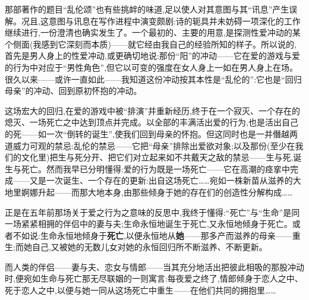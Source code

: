 那部著作的题目“乱伦颂”也有些挑衅的味道,\dmark{}足以使人对其意图与其“讯息”产生误解。况且,这意图与讯息在写作进程中演变颇剧:诗的轭具并未妨碍一项深化的工作继续进行,一份澄清也确实发生了。一个最初的、主要的用意,是探测性爱冲动的某个侧面(我感到它深刻而本质)——就它经由我自己的经验所知的样子。所以说的,首先是男人身上的性爱冲动,或更确切地说:那份“阳”的冲动——它在爱的游戏与爱的行为中对应于“男性角色”,但它以可变的强度在女人身上一如在男人身上在场。很久以来——或许一直如此——我知道这份冲动按其本性是“乱伦的”:它也是“回归母亲”的冲动、回到原初怀抱的冲动。

这场宏大的回归,在爱的游戏中被“排演”并重新经历,终于在一个寂灭、一个存在的熄灭、一场死亡之中达到顶点并完成。以全部的丰满活出爱的行为,也是活出自己的死——如一次“倒转的诞生”,使我们回到母亲的怀抱。但这同时也是一并僭越两道威力可观的禁忌:乱伦的禁忌——它把“母亲”排除出爱欲对象;以及那份(至少在我们的文化里)把生与死分开、把它们对立起来如不共戴天之敌的禁忌——生与死\dmark{},诞生与死亡。然而我早已分明懂得:爱的行为既是一场死亡——它在高潮的痉挛中完成——又是一次诞生、一个存在的更新:出自这场死亡……宛如一株新苗从滋养的大地里婀娜升起——而那大地本身,由那些倾身于她的存在们的创造性分解构成……

正是在五年前那场关于爱之行为之意味的反思中,我终于懂得:“死亡”与“生命”是同一场紧紧相拥的伴侣中的妻与夫;生命永恒地诞生于死亡,又永恒地倾身于死亡。或者不如说:生命永恒地倾身于\textbf{死亡},以便永恒地从\textbf{她}——那多产而滋养的母亲——重生;而她自己,又被她的无数儿女对她的永恒回归所不断滋养、不断更新。

而人类的伴侣——妻与夫、恋女与情郎——当其充分地活出把彼此相吸的那股冲动时,便宛如生命与死亡那无尽联姻的一则寓言:每夜爱之终了,情郎倾身于恋人之中、死于恋人之中,以便与她一同从这场死亡中重生——在他们共同的拥抱里……

